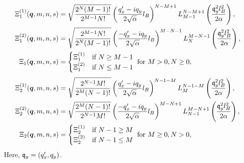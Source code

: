 \begin{subequations}
  \label{eq:xi1def}
  \begin{align}
    \Xi_1 ^{(1)}(\bm{q}, m, n, s) &= \sqrt{\frac{2^N (M-1)!}{2^{M-1} N!}}
                                     \left( \frac{q'_x - iq_y}{2 \sqrt{\alpha } } l_B \right)^{N-M + 1}
                                     L^{N-M+1}_{M-1} \left( \frac{\mathfrak{q}_y^2 l_B^2}{2 \alpha } \right),\\
    \Xi_1 ^{(2)}(\bm{q}, m, n, s) &= \sqrt{\frac{2^{M-1} N!}{2^N (M-1)!}}
                                     \left( \frac{-q'_x - iq_y}{2 \sqrt{\alpha } } l_B \right)^{M-N - 1}
                                     L^{M - N - 1}_N \left( \frac{\mathfrak{q}_y^2 l_B^2}{2 \alpha } \right),\\
    \Xi_1(\bm{q}, m, n, s) &=
                              \begin{cases}
                                \Xi _1 ^{(1)} & \text{if } N \geq M-1\\
                                \Xi _1 ^{(2)} & \text{if } N \leq M-1
                              \end{cases} \text{ for } M>0, N \geq 0,
  \end{align}
\end{subequations}
\begin{subequations}
  \label{eq:xi2def}
  \begin{align}
    \Xi_2 ^{(1)}(\bm{q}, m, n, s) &= \sqrt{\frac{2^{N-1} M!}{2^M (N-1)!}}
                                     \left( \frac{q'_x - iq_y}{2 \sqrt{\alpha }} l_B \right)^{N-1 - M}
                                     L^{N-1 -M}_{M} \left( \frac{\mathfrak{q}_y^2 l_B^2}{2 \alpha } \right),\\
    \Xi_2 ^{(2)}(\bm{q}, m, n, s) &= \sqrt{\frac{2^M (N-1)!}{2^{N-1} M!}}
                                     \left( \frac{-q'_x - iq_y}{2 \sqrt{\alpha }} l_B \right)^{M-N + 1}
                                     L^{M - N + 1}_{N-1} \left( \frac{\mathfrak{q}_y^2 l_B^2}{2 \alpha } \right),\\
    \Xi_2(\bm{q}, m, n, s) &=
                              \begin{cases}
                                \Xi _2 ^{(1)} & \text{if } N-1 \geq M\\
                                \Xi _2 ^{(2)} & \text{if } N-1 \leq M
                              \end{cases} \text{ for } M\geq 0, N > 0,
  \end{align}
\end{subequations}
Here, \( \mathfrak{q}_y = (q'_x, q_y) \).

